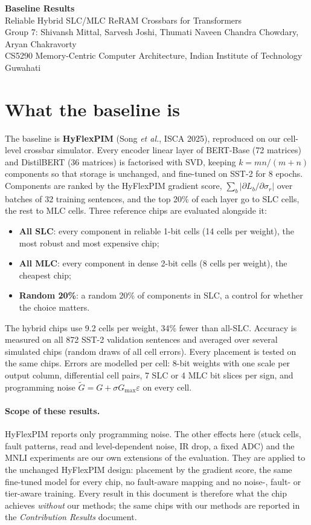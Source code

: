 \documentclass[10pt,a4paper]{article}
\begin{document}
\begin{center}
{\LARGE\bfseries Baseline Results}\\[4pt]
{\large Reliable Hybrid SLC/MLC ReRAM Crossbars for Transformers}\\[4pt]
Group 7: Shivansh Mittal, Sarvesh Joshi, Thumati Naveen Chandra Chowdary, Aryan Chakravorty\\
CS5290 Memory-Centric Computer Architecture, Indian Institute of Technology Guwahati
\end{center}

\section{What the baseline is}
The baseline is \textbf{HyFlexPIM} (Song \emph{et al.}, ISCA 2025), reproduced on our cell-level crossbar
simulator. Every encoder linear layer of BERT-Base (72 matrices) and DistilBERT (36 matrices) is factorised
with SVD, keeping $k=mn/(m+n)$ components so that storage is unchanged, and fine-tuned on SST-2 for 8
epochs. Components are ranked by the HyFlexPIM gradient score, $\sum_b|\partial L_b/\partial\sigma_r|$ over
batches of 32 training sentences, and the top 20\% of each layer go to SLC cells, the rest to MLC cells.
Three reference chips are evaluated alongside it:
\begin{itemize}
\item \textbf{All SLC}: every component in reliable 1-bit cells (14 cells per weight), the most robust and most
expensive chip;
\item \textbf{All MLC}: every component in dense 2-bit cells (8 cells per weight), the cheapest chip;
\item \textbf{Random 20\%}: a random 20\% of components in SLC, a control for whether the choice matters.
\end{itemize}
The hybrid chips use 9.2 cells per weight, 34\% fewer than all-SLC. Accuracy is measured on all 872 SST-2
validation sentences and averaged over several simulated chips (random draws of all cell errors). Every
placement is tested on the same chips. Errors are modelled per cell: 8-bit weights with one scale per output
column, differential cell pairs, 7 SLC or 4 MLC bit slices per sign, and programming noise
$\tilde G=G+\sigma G_{\max}\varepsilon$ on every cell.

\paragraph{Scope of these results.} HyFlexPIM reports only programming noise. The other effects here (stuck
cells, fault patterns, read and level-dependent noise, IR drop, a fixed ADC) and the MNLI experiments are our
own extensions of the evaluation. They are applied to the unchanged HyFlexPIM design: placement by the gradient
score, the same fine-tuned model for every chip, no fault-aware mapping and no noise-, fault- or tier-aware
training. Every result in this document is therefore what the chip achieves \emph{without} our methods; the
same chips with our methods are reported in the \emph{Contribution Results} document.
\end{document}
